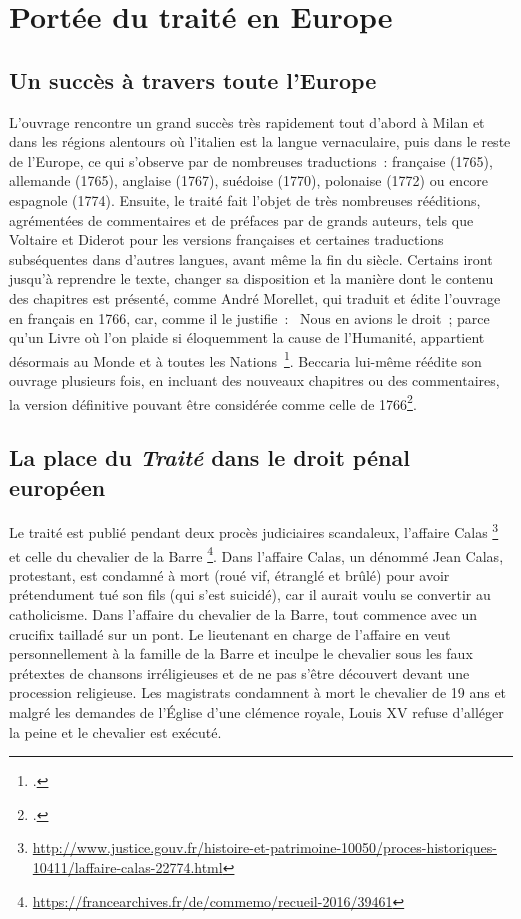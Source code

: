 \section{Portée du traité en Europe}
\subsection{Un succès à travers toute l'Europe}
L'ouvrage rencontre un grand succès très rapidement tout d'abord à Milan et dans les régions alentours où l'italien est la langue vernaculaire, puis dans le reste de l'Europe, ce qui s'observe par de nombreuses traductions~: française (1765), allemande (1765), anglaise (1767), suédoise (1770), polonaise (1772) ou encore espagnole (1774). Ensuite, le traité fait l'objet de très nombreuses rééditions, agrémentées de commentaires et de préfaces par de grands auteurs, tels que Voltaire et Diderot pour les versions françaises et certaines traductions subséquentes dans d'autres langues, avant même la fin du siècle. Certains iront jusqu'à reprendre le texte, changer sa disposition et la manière dont le contenu des chapitres est présenté, comme André Morellet, qui traduit et édite l'ouvrage en français en 1766, car, comme il le justifie~: \og~Nous en avions le droit~; parce qu'un Livre où l'on plaide si éloquemment la cause de l'Humanité, appartient désormais au Monde et à toutes les Nations~\footcite{fr1-1}\fg{}. Beccaria lui-même réédite son ouvrage plusieurs fois, en incluant des nouveaux chapitres ou des commentaires, la version définitive pouvant être considérée comme celle de 1766\footcite{it6}.

\subsection{La place du \emph{Traité} dans le droit pénal européen}
Le traité est publié pendant deux procès judiciaires scandaleux, l'affaire Calas \footnote{\url{http://www.justice.gouv.fr/histoire-et-patrimoine-10050/proces-historiques-10411/laffaire-calas-22774.html}} et celle du chevalier de la Barre \footnote{\url{https://francearchives.fr/de/commemo/recueil-2016/39461}}. 
Dans l'affaire Calas, un dénommé Jean Calas, protestant, est condamné à mort (roué vif, étranglé et brûlé) pour avoir prétendument tué son fils (qui s'est suicidé), car il aurait voulu se convertir au catholicisme. 
Dans l'affaire du chevalier de la Barre, tout commence avec un crucifix tailladé sur un pont. Le lieutenant en charge de l'affaire en veut personnellement à la famille de la Barre et inculpe le chevalier sous les faux prétextes de chansons irréligieuses et de ne pas s'être découvert devant une procession religieuse. Les magistrats condamnent à mort le chevalier de 19 ans et malgré les demandes de l'Église d'une clémence royale, Louis XV refuse d'alléger la peine et le chevalier est exécuté.

